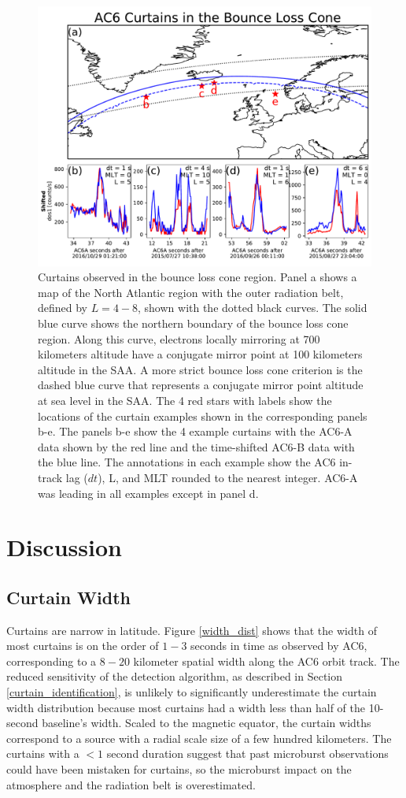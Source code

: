 \documentclass[draft]{agujournal2019}
\begin{document}
\begin{figure}
\includegraphics[width=\textwidth]{fig5.pdf}
\caption{Curtains observed in the bounce loss cone region. Panel a shows a map of the North Atlantic region with the outer radiation belt, defined by $L=4-8$, shown with the dotted black curves. The solid blue curve shows the northern boundary of the bounce loss cone region. Along this curve, electrons locally mirroring at 700 kilometers altitude have a conjugate mirror point at 100 kilometers altitude in the SAA. A more strict bounce loss cone criterion is the dashed blue curve that represents a conjugate mirror point altitude at sea level in the SAA. The 4 red stars with labels show the locations of the curtain examples shown in the corresponding panels b-e. The panels b-e show the 4 example curtains with the AC6-A data shown by the red line and the time-shifted AC6-B data with the blue line. The annotations in each example show the AC6 in-track lag ($dt$), L, and MLT rounded to the nearest integer. AC6-A was leading in all examples except in panel d.}
\label{fig3}
\end{figure}

\section{Discussion} \label{discussion}
\subsection{Curtain Width}
Curtains are narrow in latitude. Figure \ref{width_dist} shows that the width of most curtains is on the order of $1-3$ seconds in time as observed by AC6, corresponding to a $8-20$ kilometer spatial width along the AC6 orbit track. The reduced sensitivity of the detection algorithm, as described in Section \ref{curtain_identification}, is unlikely to significantly underestimate the curtain width distribution because most curtains had a width less than half of the 10-second baseline's width. Scaled to the magnetic equator, the curtain widths correspond to a source with a radial scale size of a few hundred kilometers. The curtains with a $< 1$ second duration suggest that past microburst observations could have been mistaken for curtains, so the microburst impact on the atmosphere and the radiation belt is overestimated.
\end{document}
